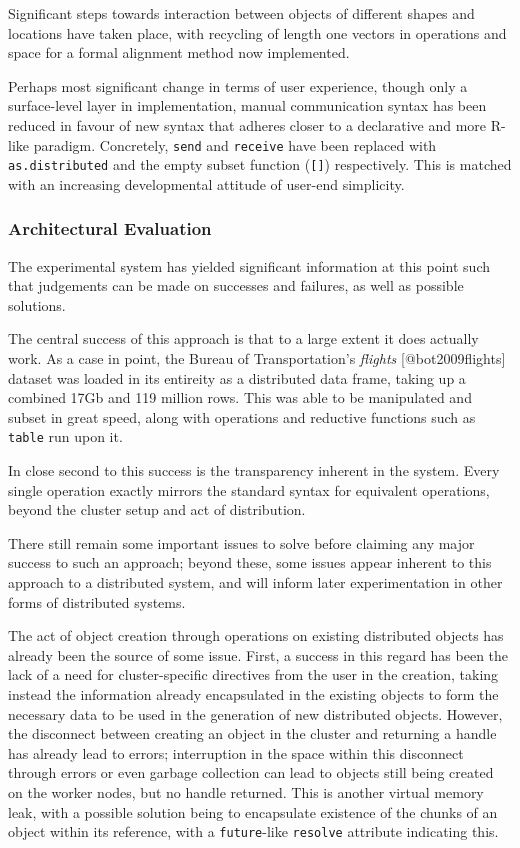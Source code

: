 Significant steps towards interaction between objects of different
shapes and locations have taken place, with recycling of length one
vectors in operations and space for a formal alignment method now
implemented.

Perhaps most significant change in terms of user experience, though only
a surface-level layer in implementation, manual communication syntax has
been reduced in favour of new syntax that adheres closer to a
declarative and more R-like paradigm. Concretely, \texttt{send} and
\texttt{receive} have been replaced with \texttt{as.distributed} and the
empty subset function (\texttt{{[}{]}}) respectively. This is matched
with an increasing developmental attitude of user-end simplicity.

\hypertarget{sec:eval}{%
\subsubsection{Architectural Evaluation}\label{sec:eval}}

The experimental system has yielded significant information at this
point such that judgements can be made on successes and failures, as
well as possible solutions.

The central success of this approach is that to a large extent it does
actually work. As a case in point, the Bureau of Transportation's
\emph{flights} {[}@bot2009flights{]} dataset was loaded in its entireity
as a distributed data frame, taking up a combined 17Gb and 119 million
rows. This was able to be manipulated and subset in great speed, along
with operations and reductive functions such as \texttt{table} run upon
it.

In close second to this success is the transparency inherent in the
system. Every single operation exactly mirrors the standard \R syntax for
equivalent operations, beyond the cluster setup and act of distribution.

There still remain some important issues to solve before claiming any
major success to such an approach; beyond these, some issues appear
inherent to this approach to a distributed system, and will inform later
experimentation in other forms of distributed systems.

The act of object creation through operations on existing distributed
objects has already been the source of some issue. First, a success in
this regard has been the lack of a need for cluster-specific directives
from the user in the creation, taking instead the information already
encapsulated in the existing objects to form the necessary data to be
used in the generation of new distributed objects. However, the
disconnect between creating an object in the cluster and returning a
handle has already lead to errors; interruption in the space within this
disconnect through errors or even garbage collection can lead to objects
still being created on the worker nodes, but no handle returned. This is
another virtual memory leak, with a possible solution being to
encapsulate existence of the chunks of an object within its reference,
with a \texttt{future}-like \texttt{resolve} attribute indicating this.

